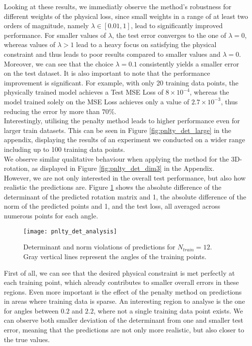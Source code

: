 Looking at these results, we immediatly observe the method's robustness for different weights of the physical loss, since small weights in a range of at least two orders of magnitude, namely $\lambda \in [0.01, 1]$, lead to significantly improved performance. For smaller values of $\lambda$, the test error converges to the one of $\lambda= 0$, whereas values of $\lambda > 1$ lead to a heavy focus on satisfying the physical constraint and thus leads to poor results compared to smaller values and $\lambda=0$.\\
\indent Moreover, we can see that the choice $\lambda = 0.1$ consistently yields a smaller error on the test dataset. It is also important to note that the performance improvement is significant. For example, with only 20 training data points, the physically trained model achieves a Test MSE Loss of $8\times10^{-4}$, whereas the model trained solely on the MSE Loss achieves only a value of $2.7\times10^{-3}$, thus reducing the error by more than $70\%$. \\
\indent Interestingly, utilising the penalty method leads to higher performance even for larger train datasets. This can be seen in Figure \ref{fig:pnlty_det_large} in the appendix, displaying the results of an experiment we conducted on a wider range including up to 100 training data points.\\
We observe similar qualitative behaviour when applying the method for the 3D-rotation, as displayed in Figure \ref{fig:pnlty_det_dim3} in the Appendix.\\
\indent However, we are not only interested in the overall test performance, but also how realistic the predictions are. Figure \ref{fig:pnlty_det_analysis} shows the absolute difference of the determinant of the predicted rotation matrix and 1, the absolute difference of the norm of the predicted points and 1, and the test loss, all averaged across numerous points for each angle.\\
\begin{figure}[H]
	\texttt{[image: pnlty\_det\_analysis]}
	\caption{Determinant and norm violations of predictions for $N_{train} = 12$. Gray vertical lines represent the angles of the training points.}
	\label{fig:pnlty_det_analysis}
\end{figure}
\indent First of all, we can see that the desired physical constraint is met perfectly at each training point, which already contributes to smaller overall errors in these regions. Even more important is the effect of the penalty method on predictions in areas where training data is sparse. An interesting region to analyse is the one for angles between $0.2$ and $2.2$, where not a single training data point exists. We can observe both smaller deviation of the determinant from one and smaller test error, meaning that the predictions are not only more realistic, but also closer to the true values.

